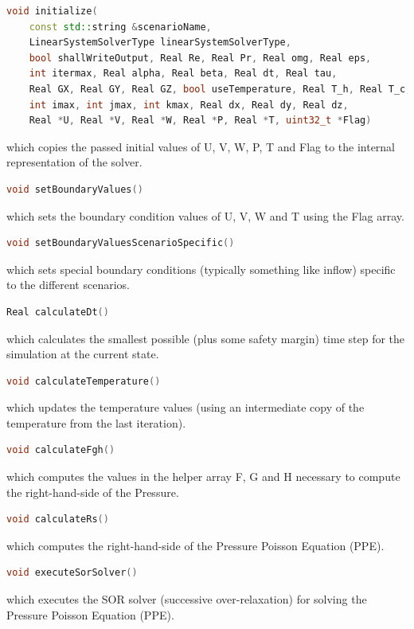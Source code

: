 \documentclass{article}%
\begin{document}
\begin{lstlisting}[language=C++,frame=single]
void initialize(
    const std::string &scenarioName,
    LinearSystemSolverType linearSystemSolverType,
    bool shallWriteOutput, Real Re, Real Pr, Real omg, Real eps,
    int itermax, Real alpha, Real beta, Real dt, Real tau,
    Real GX, Real GY, Real GZ, bool useTemperature, Real T_h, Real T_c,
    int imax, int jmax, int kmax, Real dx, Real dy, Real dz,
    Real *U, Real *V, Real *W, Real *P, Real *T, uint32_t *Flag)
\end{lstlisting}
which copies the passed initial values of U, V, W, P, T and Flag to the internal representation of the solver.

\begin{lstlisting}[language=C++,frame=single]
void setBoundaryValues()
\end{lstlisting}
which sets the boundary condition values of U, V, W and T using the Flag array.

\begin{lstlisting}[language=C++,frame=single]
void setBoundaryValuesScenarioSpecific()
\end{lstlisting}
which sets special boundary conditions (typically something like inflow) specific to the different scenarios.

\begin{lstlisting}[language=C++,frame=single]
Real calculateDt()
\end{lstlisting}
which calculates the smallest possible (plus some safety margin) time step for the simulation at the current state.

\begin{lstlisting}[language=C++,frame=single]
void calculateTemperature()
\end{lstlisting}
which updates the temperature values (using an intermediate copy of the temperature from the last iteration).

\begin{lstlisting}[language=C++,frame=single]
void calculateFgh()
\end{lstlisting}
which computes the values in the helper array F, G and H necessary to compute the right-hand-side of the Pressure.

\begin{lstlisting}[language=C++,frame=single]
void calculateRs()
\end{lstlisting}
which computes the right-hand-side of the Pressure Poisson Equation (PPE).

\begin{lstlisting}[language=C++,frame=single]
void executeSorSolver()
\end{lstlisting}
which executes the SOR solver (successive over-relaxation) for solving the Pressure Poisson Equation (PPE).
\end{document}
